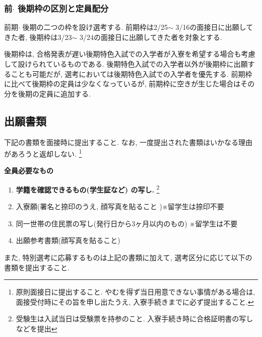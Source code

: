 \documentclass[10pt,b5jsbook,dvips,dvipdfmx,openany]{jsbook}
\theoremstyle{definition}
\begin{document}
			\subsubsection{前$ \cdot $ 後期枠の区別と定員配分}
			前期$ \cdot $ 後期の二つの枠を設け選考する. 前期枠は2/25$ \sim $ 3/16の面接日に出願してきた者, 後期枠は3/23$ \sim $ 3/24の面接日に出願してきた者を対象とする.

			後期枠は, 合格発表が遅い後期特色入試での入学者が入寮を希望する場合も考慮して設けられているものである. 後期特色入試での入学者以外が後期枠に出願することも可能だが, 選考においては後期特色入試での入学者を優先する. 前期枠に比べて後期枠の定員は少なくなっているが, 前期枠に空きが生じた場合はその分を後期の定員に追加する.

\newpage %

		\subsection{出願書類}

 		下記の書類を面接時に提出すること. なお, 一度提出された書類はいかなる理由があろうと返却しない. \footnote{原則面接日に提出すること. やむを得ず当日用意できない事情がある場合は, 面接受付時にその旨を申し出たうえ, 入寮手続きまでに必ず提出すること. }

 		\begin{itembox}[l]{\bf 全員必要なもの}
		\begin{enumerate}
		\item \textbf{学籍を確認できるもの(学生証など) の写し.} \footnote{受験生は入試当日は受験票を持参のこと. 入寮手続き時に合格証明書の写しなどを提出}
		\item 入寮願(署名と捺印のうえ, 顔写真を貼ること )※留学生は捺印不要
		\setcounter{mymemory}{\value{enumi}}
		\item 同一世帯の住民票の写し(発行日から3ヶ月以内のもの) ※留学生は不要
		\item 出願参考書類(顔写真を貼ること)
		\end{enumerate}
		\end{itembox}

		また, 特別選考に応募するものは上記の書類に加えて, 選考区分に応じて以下の書類を提出すること.
\end{document}
